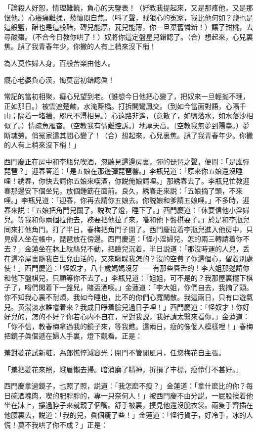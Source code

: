 「論殺人好恕，情理難饒，負心的天鑒表！（好教我提起來，又是那疼他，又是那恨他。）心癢痛難揉，愁懷悶自焦。（呌了聲，賊狠心的寃家，我比他何如？鹽也是這般鹽，醋也是這般醋，磚兒能厚，瓦兒能薄，你一旦棄舊憐新！）讓了甜桃，去尋酸棗。（不合今日教你哄了！）奴將你這定盤星兒錯認了。（合）想起來，心兒裏焦。誤了我青春年少，你撇的人有上梢來沒下梢！　

為人莫作婦人身，百般苦楽由他人。

癡心老婆負心漢，悔莫當初錯認眞！

常記的當初相聚，癡心兒望到老。（誰想今日他把心變了，把奴來一旦輕抛不理，正如那日。）被雲遮楚岫，水淹藍橋。打拆開鸞鳳交。（到如今當面對語，心隔千山；隔着一堵牆，咫尺不淂相見。）心遠路非遙，（意散了，如鹽落水，如水落沙相似了。）情疏魚雁杳。（空教我有情難控訴。）地厚天高。（空教我無夢到陽臺。）夢断魂勞。俏冤家這其間心變了！（合）想起來，心兒裏焦。誤了我青春年少。你撇的人有上梢來沒下梢！」

西門慶正在房中和李瓶兒喫酒，忽聽見這邊房裏，彈的琵琶之聲，便問：「是誰彈琵琶？」迎春答道：「是五娘在那邊彈琵琶響。」李瓶兒道：「原來你五娘還沒睡哩！綉春，你快去請你五娘來喫酒，你説俺娘請哩。」那綉春去了。李瓶兒忙教迎春那邊安下個坐兒，放個鍾筯在面前。良久，綉春走來説：「五娘摘了頭，不來哩。」李瓶兒道：「迎春，你再去請你五娘去。你説娘和爹請五娘哩。」不多時，迎春來説：「五娘把角門兒關了。説吹了燈，睡下了。」西門慶道：「休要信他小淫婦兒。等我和你兩個拉他去，務要把他拉了來，喒和他下盤棋耍子。」於是和李瓶兒同來打他角門。打了半日，春梅把角門子開了。西門慶拉着李瓶兒進入他房中，只見婦人坐在帳中，琵琶放在傍邊。西門慶道：「怪小淫婦兒，怎的兩三轉請着你不去？」金蓮坐在牀上紋絲兒不動，把臉兒沉着，半日説道：「那沒時運的人兒，丢在這冷屋裏隨我自生兒由活的，又來瞅睬我怎的？沒的空費了你這個心，留着別處使！」西門慶道：「怪奴才，八十歲媽媽沒牙——有那些唇舌的！李大姐那邊請你和他下盤棋兒，只顧等你不去了。」李瓶兒道：「姐姐，可不是的？我那屋裏擺下棋子了，喒們閑着下一盤兒，賭盃酒喫。」金蓮道：「李大姐，你們自去，我摘了頭。你不知我心裏不耐煩，我如今睡也，比不的你們心寬閑散。我這兩日，只有口遊氣兒。黄湯淡水誰嚐着來？我成日睜着臉兒過日子哩！」西門慶道：「怪奴才！你好好兒的，怎的不好？你若心内不自在，早對我説，我好請太醫來看你。」金蓮道：「你不信，教春梅拿過我的鏡子來，等我瞧。這兩日，瘦的像個人模樣哩！」春梅把鏡子眞個遞在婦人手裏，燈下觀看。正是：

羞對菱花試新粧，為郎憔悴減容光；閉門不管閒風月，任您梅花自主張。

「羞把菱花來照，蛾眉懶去掃。暗消磨了精神，折損了丰標，瘦伶仃不甚好。」

西門慶拿過鏡子，也照了照，説道：「我怎麽不瘦？」金蓮道：「拿什麽比的你？每日碗酒塊肉，喫的肥胖胖的，專一只奈何人！」被西門慶不由分説，一屁股挨着他坐在牀上，摟過脖子來就親了個嘴。舒手被裏，摸見他還沒脫衣裳。兩隻手齊插在他腰裏去，説道：「我的兒，眞個瘦了些！」金蓮道：「怪行貨子，好冷手，冰的人慌！莫不我哄了你不成？」正是：

